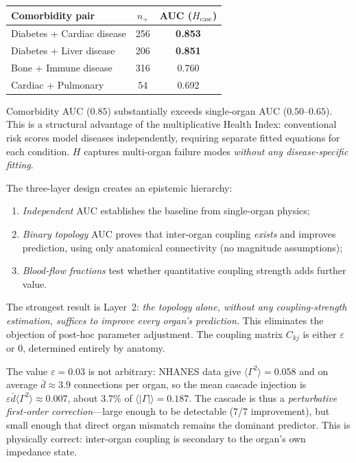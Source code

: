 \documentclass[aps,pre,twocolumn,superscriptaddress,floatfix]{revtex4-2}
\begin{document}
\begin{center}
\begin{tabular}{lcc}
\toprule
Comorbidity pair & $n_+$ & AUC ($H_{\text{casc}}$) \\
\midrule
Diabetes + Cardiac disease & 256 & \textbf{0.853} \\
Diabetes + Liver disease   & 206 & \textbf{0.851} \\
Bone + Immune disease      & 316 & 0.760 \\
Cardiac + Pulmonary        &  54 & 0.692 \\
\bottomrule
\end{tabular}
\end{center}

\noindent
Comorbidity AUC ($0.85$) substantially exceeds
single-organ AUC ($0.50$--$0.65$).
This is a structural advantage of the
multiplicative Health Index:
conventional risk scores model diseases
independently, requiring separate fitted
equations for each condition.
$H$ captures multi-organ failure modes
\emph{without any disease-specific fitting}.

\begin{remark}
\label{rem:cascade-epistemic}
The three-layer design creates an
epistemic hierarchy:
\begin{enumerate}
  \item \emph{Independent} AUC establishes
    the baseline from single-organ physics;
  \item \emph{Binary topology} AUC proves
    that inter-organ coupling \emph{exists}
    and improves prediction, using only
    anatomical connectivity
    (no magnitude assumptions);
  \item \emph{Blood-flow fractions}
    test whether quantitative coupling
    strength adds further value.
\end{enumerate}
The strongest result is Layer~2:
\emph{the topology alone, without any
coupling-strength estimation, suffices
to improve every organ's prediction.}
This eliminates the objection of post-hoc
parameter adjustment.
The coupling matrix $C_{kj}$ is either
$\varepsilon$ or $0$, determined entirely
by anatomy.

The value $\varepsilon = 0.03$ is not arbitrary:
NHANES data give $\langle\Gamma^2\rangle = 0.058$
and on average $\bar{d} \approx 3.9$ connections
per organ, so the mean cascade injection is
$\varepsilon \bar{d} \langle\Gamma^2\rangle
\approx 0.007$,
about $3.7\%$ of $\langle|\Gamma|\rangle = 0.187$.
The cascade is thus a \emph{perturbative
first-order correction}---large enough to be
detectable (7/7 improvement), but small enough
that direct organ mismatch remains the dominant
predictor.
This is physically correct: inter-organ
coupling is secondary to the organ's own
impedance state.
\end{remark}
\end{document}
